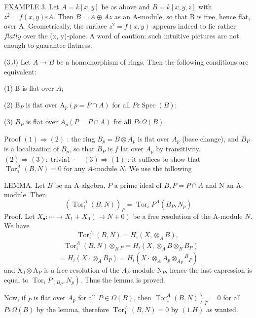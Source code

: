 EXAMPLE 3. Let $A=k[x, y]$ be as above and $B=k[x, y, z]$ with $z^{2}=f(x, y) \varepsilon A$. Then $B=A \oplus A z$ as an A-module, so that B is free, hence flat, over A. Geometrically, the surface $z^{2}=f(x, y)$ appears indeed to lie rather $f l a t l y$ over the (x, y)-plane. A word of caution: such intuitive pictures are not enough to guarantee flatness.

(3.J) Let $A \rightarrow B$ be a homomorphism of rings. Then the following conditions are equivalent:

(1) B is flat over $A$;

(2) $\mathrm{B}_{P}$ is flat over $\mathrm{A}_{p}(p=P \cap A)$ for all $P \varepsilon \operatorname{Spec}(B)$;

(3) $B_{P}$ is flat over $A_{p}(P=P \cap A)$ for all $P \varepsilon \Omega(B)$.

Proof $(1) \Rightarrow(2)$ : the ring $B_{p}=B \otimes A_{p}$ is flat over $A_{p}$ (base change), and $B_{P}$ is a localization of $B_{p}$, so that $B_{P}$ is $f$ lat over $A_{p}$ by transitivity. $(2) \Rightarrow(3): \operatorname{trivia1} \cdot \quad(3) \Rightarrow(1)$ : it suffices to show that $\operatorname{Tor}_{1}^{A}(B, N)=0$ for any $A$-module $N$. We use the following

LEMMA. Let $B$ be an A-algebra, $P$ a prime ideal of $B, P=P \cap A$ and $\mathrm{N}$ an A-module. Then
$$
\left(\operatorname{Tor}_{i}^{A}(B, N)\right)_{P}=\operatorname{Tor}_{i} P^{A}\left(B_{P}, N_{p}\right)
$$
Proof. Let $X_{\bullet}: \cdots \rightarrow X_{1}+X_{0}(\rightarrow N+0)$ be a free resolution of the A-module $N$. We have
$$
\operatorname{Tor}_{i}^{A}(B, N)=H_{i}\left(X, \otimes_{A} B\right) \text {, }
$$
$$
\begin{aligned}
& \operatorname{Tor}_{i}^{A}(B, N) \otimes_{B}{ }_{P}=H_{i}\left(X, \otimes_{A} B \otimes_{B} B_{P}\right)
\end{aligned}
$$
$$
=H_{i}\left(X \cdot \otimes_{A} B_{P}\right)=H_{i}\left(X \cdot \otimes_{A} A_{p} \otimes_{A_{P}}{ }^{B}{ }_{P}\right)
$$
and $\mathrm{X}_{0} \otimes \mathrm{A}_{P}$ is a free resolution of the $A_{P}$-module $\mathrm{N}_{P}$, hence the last expression is equal to $\left.\operatorname{Tor}_{i} P_{\left(B_{P}\right.}, N_{p}\right)$. Thus the lemma is proved.

Now, if ${ }_{P}$ is flat over $A_{p}$ for all $P \in \Omega(B)$, then $\left.\operatorname{Tor}_{1}^{A}(B, N)\right)_{P}=0$ for all $P \varepsilon \Omega(B)$ by the lemma, therefore $\operatorname{Tor}_{1}^{A}(B, N)=0$ by $(1 . H)$ as wanted.


